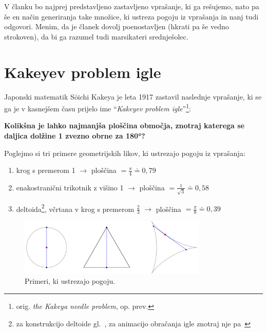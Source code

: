 \documentclass[a4paper, 12pt]{article}
\begin{document}
V članku bo najprej predstavljeno zastavljeno vprašanje, ki ga rešujemo, nato pa še en način generiranja take množice, ki ustreza pogoju iz vprašanja in nanj tudi odgovori. Menim, da je članek dovolj poenostavljen (hkrati pa še vedno strokoven), da bi ga razumel tudi marsikateri srednješolec.

\newpage


\section*{Kakeyev problem igle}

Japonski matematik Sōichi Kakeya je leta 1917 zastavil naslednje vprašanje, ki se ga je v kasnejšem času prijelo ime ``\emph{Kakeyev problem igle}''\footnote{orig. \emph{the Kakeya needle problem}, op. prev.}:

\vspace{0.2cm}
\begin{center}
    \textbf{Kolikšna je lahko najmanjša ploščina območja, znotraj katerega se daljica dolžine 1 zvezno obrne za 180°?}
\end{center}
\vspace{0.2cm}

\noindent Poglejmo si tri primere geometrijskih likov, ki ustrezajo pogoju iz vprašanja:

\begin{enumerate}
    \item krog s premerom 1 $ \rightarrow $ ploščina $ = \frac{\pi}{4} \doteq 0{,}79 $
    \item enakostranični trikotnik z višino 1 $ \rightarrow $ ploščina $ = \frac{1}{\sqrt{3}} \doteq 0{,}58 $
    \item deltoida\footnote{za konstrukcijo deltoide gl.~\cite{deltoida}, za animacijo obračanja igle znotraj nje pa~\cite{kakeya_wiki}}, včrtana v krog s premerom $ \frac{2}{3} $ $ \rightarrow $ ploščina $ = \frac{\pi}{8} \doteq 0{,}39 $
\end{enumerate}

\begin{figure}[h!]
    \centering
    \includegraphics[width=0.8\textwidth]{geogebra_slike/prevelike_ploscine.png}
    \caption{Primeri, ki ustrezajo pogoju.}
    \label{primeri}
\end{figure}
\end{document}

